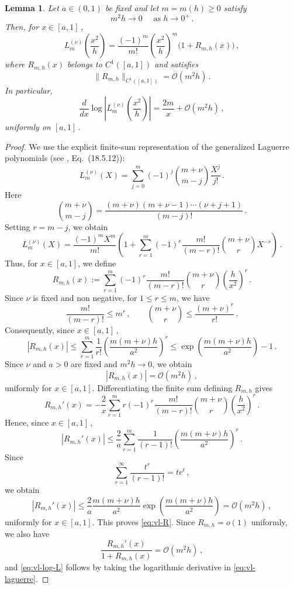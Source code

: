 \documentclass[11pt]{amsart}
\numberwithin{equation}{section}
\newtheorem{lemma}[theorem]{Lemma}
\theoremstyle{remark}
\begin{document}
\begin{lemma}\label{lem:vl-laguerre}
	Let $a\in(0,1)$ be fixed and let $m=m(h)\geq0$ satisfy
	\[
		m^2h\longrightarrow 0\quad\text{ as $h\to0^+$}\,.
	\]
	Then,  for $x\in[a,1]$\,,
	\begin{equation}\label{eq:vl-laguerre}
		L_m^{(\nu)}\left(\frac{x^2}{h}\right)
		=
		\frac{(-1)^m}{m!}
		\left(\frac{x^2}{h}\right)^m
		\bigl(1+R_{m,h}(x)\bigr)\,,
	\end{equation}
	where $R_{m,h}(x)$ belongs to $C^1([a,1])$ and satisfies
	\begin{equation}\label{eq:vl-R}
		\|R_{m,h}\|_{C^1([a,1])}=\mathcal O(m^2h)\,.
	\end{equation}
	In particular,
	\begin{equation}\label{eq:vl-log-L}
		\frac{d}{dx}
		\log\left|
		L_m^{(\nu)}\left(\frac{x^2}{h}\right)
		\right|
		=
		\frac{2m}{x}+\mathcal O(m^2h)\,,
	\end{equation}
	uniformly on $[a,1]$\,.
\end{lemma}
%
\begin{proof}
	We use the explicit finite-sum representation of the generalized
	Laguerre polynomials (see \cite{DLMF}, Eq.~(18.5.12)):
	\[
		L_m^{(\nu)}(X)
		=
		\sum_{j=0}^{m}
		(-1)^j
		\binom{m+\nu}{m-j}
		\frac{X^j}{j!}\,.
	\]
Here
\[
\binom{m+\nu}{m-j}
=
\frac{(m+\nu)(m+\nu-1)\cdots(\nu+j+1)}
{(m-j)!}\,.
\]
Setting $r=m-j$, we obtain
	\[
		L_m^{(\nu)}(X)
		=
		\frac{(-1)^mX^m}{m!}
		\left(
		1+
		\sum_{r=1}^m
		(-1)^r
		\frac{m!}{(m-r)!}
		\binom{m+\nu}{r}X^{-r}
		\right)\,.
	\]
	Thus, for $x\in[a,1]$, we define
	\[
		R_{m,h}(x)
		:=
		\sum_{r=1}^m
		(-1)^r
		\frac{m!}{(m-r)!}
		\binom{m+\nu}{r}
		\left(\frac{h}{x^2}\right)^r\,.
	\]
	Since $\nu$ is fixed and  non negative, for $1\leq r\leq m$, we have
\[
	\frac{m!}{(m-r)!}\leq m^r\,,
	\qquad
	\binom{m+\nu}{r}
	\leq
	\frac{(m+\nu)^r}{r!}\,.
\]
Consequently, since $x\in[a,1]$\,,
\[
	|R_{m,h}(x)|
	\leq
	\sum_{r=1}^{m}
	\frac{1}{r!}
	\left(
		\frac{m(m+\nu)h}{a^2}
	\right)^r
	\leq
	\exp\left(
		\frac{m(m+\nu)h}{a^2}
	\right)-1\,.
\]
Since $\nu$ and $a>0$ are fixed and $m^2h\to0$, we obtain
\[
	|R_{m,h}(x)|=\mathcal O(m^2h)\,,
\]
uniformly for $x\in[a,1]$. Differentiating the finite sum defining $R_{m,h}$ gives
\[
	R_{m,h}'(x)
	=
	-\frac{2}{x}
	\sum_{r=1}^m
	r(-1)^r
	\frac{m!}{(m-r)!}
	\binom{m+\nu}{r}
	\left(\frac{h}{x^2}\right)^r\,.
\]
Hence, since $x\in[a,1]$\,,
\[
	|R_{m,h}'(x)|
	\leq
	\frac{2}{a}
	\sum_{r=1}^{m}
	\frac{1}{(r-1)!}
	\left(
		\frac{m(m+\nu)h}{a^2}
	\right)^r\,.
\]
Since
\[
	\sum_{r=1}^{\infty} \frac{t^r}{(r-1)!}
	=
	t e^t\,,
\]
we obtain
\[
	|R_{m,h}'(x)|
	\leq
	\frac{2}{a}
	\frac{m(m+\nu)h}{a^2}
	\exp\left(
		\frac{m(m+\nu)h}{a^2}
	\right)
	=
	\mathcal O(m^2h)\,,
\]
uniformly for $x\in[a,1]$. This proves \eqref{eq:vl-R}. Since $R_{m,h}=o(1)$ uniformly,
	we also have
	\[
		\frac{R_{m,h}'(x)}{1+R_{m,h}(x)}
		=
	\mathcal	O(m^2h)\,,
	\]
	and \eqref{eq:vl-log-L} follows by taking the logarithmic
	derivative in \eqref{eq:vl-laguerre}.
\end{proof}
\end{document}
